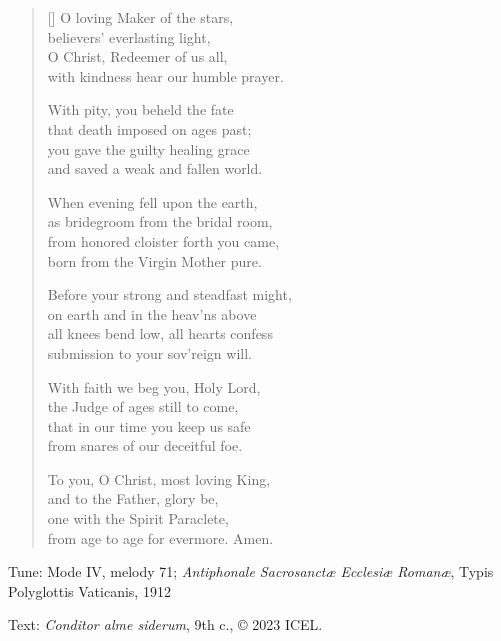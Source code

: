 \hymn

\settowidth{\versewidth}{Before your strong and steadfast might,}

\begin{verse}[\versewidth]
O loving Maker of the stars,\\
believers’ everlasting light,\\
O Christ, Redeemer of us all,\\
with kindness hear our humble prayer.

With pity, you beheld the fate\\
that death imposed on ages past;\\
you gave the guilty healing grace\\
and saved a weak and fallen world.

When evening fell upon the earth,\\
as bridegroom from the bridal room,\\
from honored cloister forth you came,\\
born from the Virgin Mother pure.

Before your strong and steadfast might,\\
on earth and in the heav’ns above\\
all knees bend low, all hearts confess\\
submission to your sov’reign will.

With faith we beg you, Holy Lord,\\
the Judge of ages still to come,\\
that in our time you keep us safe\\
from snares of our deceitful foe.

To you, O Christ, most loving King,\\
and to the Father, glory be,\\
one with the Spirit Paraclete,\\
from age to age for evermore. Amen.
\end{verse}

\begin{hymnsource}
Tune: Mode IV, melody 71; \emph{Antiphonale Sacrosanctæ Ecclesiæ Romanæ}, Typis Polyglottis Vaticanis, 1912

Text: \emph{Conditor alme siderum}, 9th c., © 2023 ICEL.
\end{hymnsource}